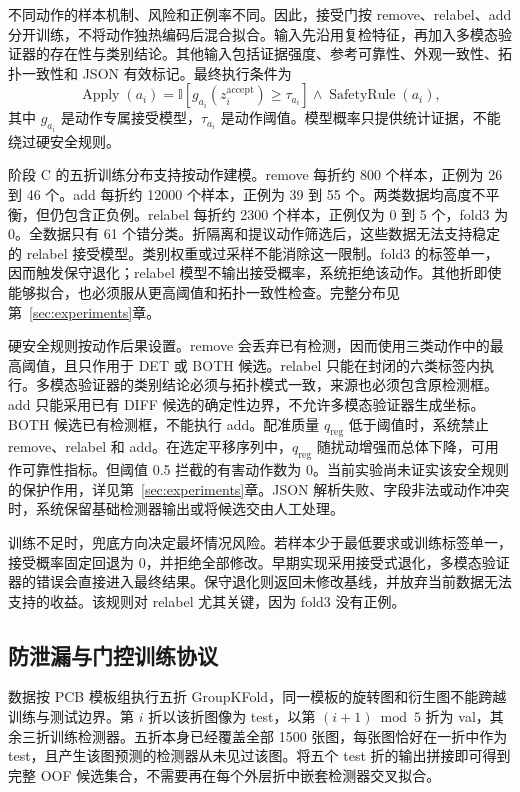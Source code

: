 不同动作的样本机制、风险和正例率不同。因此，接受门按 remove、relabel、add 分开训练，不将动作独热编码后混合拟合。输入先沿用复检特征，再加入多模态验证器的存在性与类别结论。其他输入包括证据强度、参考可靠性、外观一致性、拓扑一致性和 JSON 有效标记。最终执行条件为
\begin{equation}
 \operatorname{Apply}(a_i)=
 \mathbb{I}[g_{a_i}(z_i^{\mathrm{accept}})\geq \tau_{a_i}]
 \land \operatorname{SafetyRule}(a_i),
 \label{eq:accept-rule}
\end{equation}
其中 $g_{a_i}$ 是动作专属接受模型，$\tau_{a_i}$ 是动作阈值。模型概率只提供统计证据，不能绕过硬安全规则。

阶段 C 的五折训练分布支持按动作建模。remove 每折约 800 个样本，正例为 26 到 46 个。add 每折约 12000 个样本，正例为 39 到 55 个。两类数据均高度不平衡，但仍包含正负例。relabel 每折约 2300 个样本，正例仅为 0 到 5 个，fold3 为 0。全数据只有 61 个错分类。折隔离和提议动作筛选后，这些数据无法支持稳定的 relabel 接受模型。类别权重或过采样不能消除这一限制。fold3 的标签单一，因而触发保守退化；relabel 模型不输出接受概率，系统拒绝该动作。其他折即使能够拟合，也必须服从更高阈值和拓扑一致性检查。完整分布见第~\ref{sec:experiments}章。

硬安全规则按动作后果设置。remove 会丢弃已有检测，因而使用三类动作中的最高阈值，且只作用于 DET 或 BOTH 候选。relabel 只能在封闭的六类标签内执行。多模态验证器的类别结论必须与拓扑模式一致，来源也必须包含原检测框。add 只能采用已有 DIFF 候选的确定性边界，不允许多模态验证器生成坐标。BOTH 候选已有检测框，不能执行 add。配准质量 $q_{\mathrm{reg}}$ 低于阈值时，系统禁止 remove、relabel 和 add。在选定平移序列中，$q_{\mathrm{reg}}$ 随扰动增强而总体下降，可用作可靠性指标。但阈值 0.5 拦截的有害动作数为 0。当前实验尚未证实该安全规则的保护作用，详见第~\ref{sec:experiments}章。JSON 解析失败、字段非法或动作冲突时，系统保留基础检测器输出或将候选交由人工处理。

训练不足时，兜底方向决定最坏情况风险。若样本少于最低要求或训练标签单一，接受概率固定回退为 0，并拒绝全部修改。早期实现采用接受式退化，多模态验证器的错误会直接进入最终结果。保守退化则返回未修改基线，并放弃当前数据无法支持的收益。该规则对 relabel 尤其关键，因为 fold3 没有正例。

\subsection{防泄漏与门控训练协议}
\label{subsec:gating-protocol}

数据按 PCB 模板组执行五折 GroupKFold，同一模板的旋转图和衍生图不能跨越训练与测试边界。第 $i$ 折以该折图像为 test，以第 $(i+1)\bmod 5$ 折为 val，其余三折训练检测器。五折本身已经覆盖全部 1500 张图，每张图恰好在一折中作为 test，且产生该图预测的检测器从未见过该图。将五个 test 折的输出拼接即可得到完整 OOF 候选集合，不需要再在每个外层折中嵌套检测器交叉拟合。


